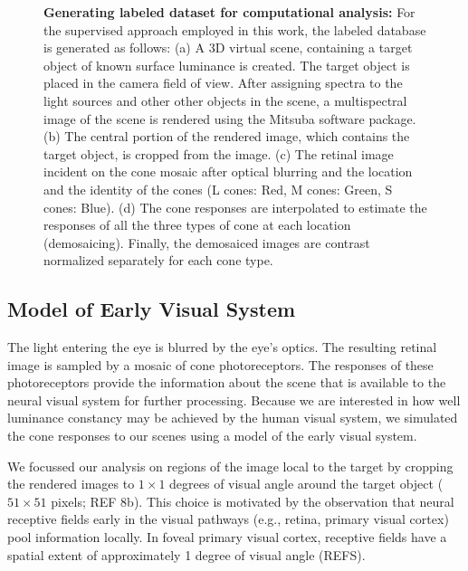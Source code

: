 \documentclass{jov}
\begin{document}
\begin{figure}
\begin{subfigure}[b]{0.2 \textwidth}
        \label{fig:coneContrast}
    \end{subfigure}
    \label{fig:sceneWithCroppedImage}
    \caption{{\bf Generating labeled dataset for computational analysis:}  For the supervised approach employed in this work, the labeled database is generated as follows: (a) A 3D virtual scene, containing a target object of known surface luminance is created. The target object is placed in the camera field of view. After assigning spectra to the light sources and other other objects in the scene, a multispectral image of the scene is rendered using the Mitsuba software package. (b) The central portion of the rendered image, which contains the target object, is cropped from the image. (c) The retinal image incident on the cone mosaic after optical blurring and the location and the identity of the cones (L cones: Red, M cones: Green, S cones: Blue).  (d) The cone responses are interpolated to estimate the responses of all the three types of cone at each location (demosaicing). Finally, the demosaiced images are contrast normalized separately for each cone type.}
\end{figure}

\subsection{Model of Early Visual System} \label{method:Isetbio}

The light entering the eye is blurred by the eye's optics.
The resulting retinal image is sampled by a mosaic of cone photoreceptors.
The responses of these photoreceptors provide the information about the scene that is available to the neural visual system for further processing.
Because we are interested in how well luminance constancy may be achieved by the human visual system, we simulated the cone responses
to our scenes using a model of the early visual system.

We focussed our analysis on regions of the image local to the target by cropping the rendered images to $1 \times 1$ degrees of visual angle around the target object ($51 \times 51$ pixels; REF 8b).
This choice is motivated by the observation that neural receptive fields early in the visual pathways (e.g., retina, primary visual cortex) pool information locally.
In foveal primary visual cortex, receptive fields have a spatial extent of approximately 1 degree of visual angle (REFS).
\end{document}
